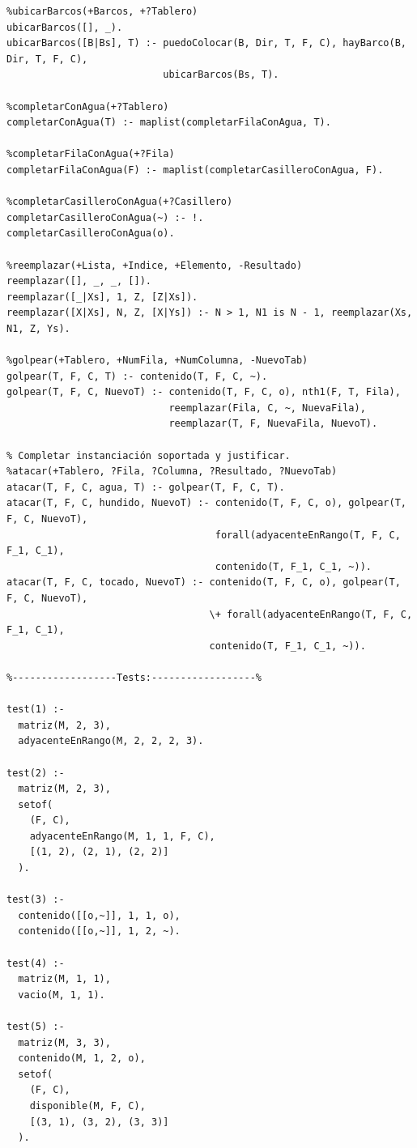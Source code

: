 \documentclass[a4paper]{article}
\begin{document}
\begin{verbatim}
%ubicarBarcos(+Barcos, +?Tablero)
ubicarBarcos([], _).
ubicarBarcos([B|Bs], T) :- puedoColocar(B, Dir, T, F, C), hayBarco(B, Dir, T, F, C), 
                           ubicarBarcos(Bs, T).

%completarConAgua(+?Tablero)
completarConAgua(T) :- maplist(completarFilaConAgua, T).

%completarFilaConAgua(+?Fila)
completarFilaConAgua(F) :- maplist(completarCasilleroConAgua, F).

%completarCasilleroConAgua(+?Casillero)
completarCasilleroConAgua(~) :- !.
completarCasilleroConAgua(o).

%reemplazar(+Lista, +Indice, +Elemento, -Resultado)
reemplazar([], _, _, []).
reemplazar([_|Xs], 1, Z, [Z|Xs]).
reemplazar([X|Xs], N, Z, [X|Ys]) :- N > 1, N1 is N - 1, reemplazar(Xs, N1, Z, Ys).

%golpear(+Tablero, +NumFila, +NumColumna, -NuevoTab)
golpear(T, F, C, T) :- contenido(T, F, C, ~).
golpear(T, F, C, NuevoT) :- contenido(T, F, C, o), nth1(F, T, Fila),
                            reemplazar(Fila, C, ~, NuevaFila),
                            reemplazar(T, F, NuevaFila, NuevoT).

% Completar instanciación soportada y justificar.
%atacar(+Tablero, ?Fila, ?Columna, ?Resultado, ?NuevoTab)
atacar(T, F, C, agua, T) :- golpear(T, F, C, T).
atacar(T, F, C, hundido, NuevoT) :- contenido(T, F, C, o), golpear(T, F, C, NuevoT),
                                    forall(adyacenteEnRango(T, F, C, F_1, C_1), 
                                    contenido(T, F_1, C_1, ~)).
atacar(T, F, C, tocado, NuevoT) :- contenido(T, F, C, o), golpear(T, F, C, NuevoT),
                                   \+ forall(adyacenteEnRango(T, F, C, F_1, C_1), 
                                   contenido(T, F_1, C_1, ~)).

%------------------Tests:------------------%

test(1) :-
  matriz(M, 2, 3),
  adyacenteEnRango(M, 2, 2, 2, 3).
  
test(2) :-
  matriz(M, 2, 3),
  setof(
    (F, C),
    adyacenteEnRango(M, 1, 1, F, C),
    [(1, 2), (2, 1), (2, 2)]
  ).
  
test(3) :-
  contenido([[o,~]], 1, 1, o),
  contenido([[o,~]], 1, 2, ~).
  
test(4) :-
  matriz(M, 1, 1),
  vacio(M, 1, 1).
  
test(5) :-
  matriz(M, 3, 3),
  contenido(M, 1, 2, o),
  setof(
    (F, C),
    disponible(M, F, C),
    [(3, 1), (3, 2), (3, 3)]
  ).
  

\end{verbatim}
\end{document}
